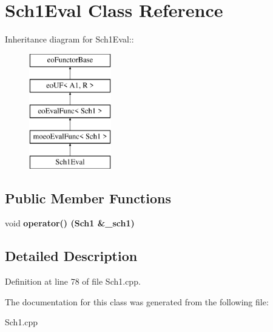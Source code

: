 \section{Sch1Eval Class Reference}
\label{classSch1Eval}
Inheritance diagram for Sch1Eval::\begin{figure}[H]
\begin{center}
\leavevmode
\includegraphics[height=5cm]{classSch1Eval}
\end{center}
\end{figure}
\subsection*{Public Member Functions}
\begin{CompactItemize}
\item 
void \bf{operator()} (\bf{Sch1} \&\_\-sch1)\label{classSch1Eval_4f806a964f7bafa9e4fcca45da458c98}

\end{CompactItemize}


\subsection{Detailed Description}




Definition at line 78 of file Sch1.cpp.

The documentation for this class was generated from the following file:\begin{CompactItemize}
\item 
Sch1.cpp\end{CompactItemize}
